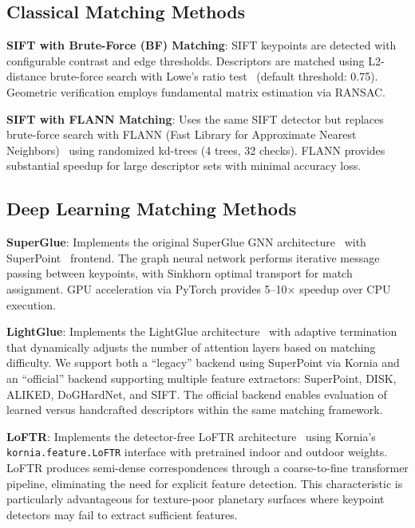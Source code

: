 \documentclass[lettersize,journal]{IEEEtran}
\begin{document}
\subsection{Classical Matching Methods}

\textbf{SIFT with Brute-Force (BF) Matching}: SIFT keypoints are detected with configurable contrast and edge thresholds. Descriptors are matched using L2-distance brute-force search with Lowe's ratio test~\cite{lowe1999ratio} (default threshold: 0.75). Geometric verification employs fundamental matrix estimation via RANSAC.

\textbf{SIFT with FLANN Matching}: Uses the same SIFT detector but replaces brute-force search with FLANN (Fast Library for Approximate Nearest Neighbors)~\cite{muja2009flann} using randomized kd-trees (4 trees, 32 checks). FLANN provides substantial speedup for large descriptor sets with minimal accuracy loss.

\subsection{Deep Learning Matching Methods}

\textbf{SuperGlue}: Implements the original SuperGlue GNN architecture~\cite{sarlin2020superglue} with SuperPoint~\cite{detone2018superpoint} frontend. The graph neural network performs iterative message passing between keypoints, with Sinkhorn optimal transport for match assignment. GPU acceleration via PyTorch provides 5--10$\times$ speedup over CPU execution.

\textbf{LightGlue}: Implements the LightGlue architecture~\cite{lindenberger2023lightglue} with adaptive termination that dynamically adjusts the number of attention layers based on matching difficulty. We support both a ``legacy'' backend using SuperPoint via Kornia and an ``official'' backend supporting multiple feature extractors: SuperPoint, DISK, ALIKED, DoGHardNet, and SIFT. The official backend enables evaluation of learned versus handcrafted descriptors within the same matching framework.

\textbf{LoFTR}: Implements the detector-free LoFTR architecture~\cite{sun2021loftr} using Kornia's \texttt{kornia.feature.LoFTR} interface with pretrained indoor and outdoor weights. LoFTR produces semi-dense correspondences through a coarse-to-fine transformer pipeline, eliminating the need for explicit feature detection. This characteristic is particularly advantageous for texture-poor planetary surfaces where keypoint detectors may fail to extract sufficient features.
\end{document}
